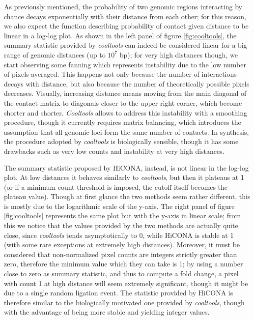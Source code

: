 As previously mentioned, the probability of two genomic regions interacting by chance decays exponentially with their distance from each other; for this reason, we also expect the function describing probability of contact given distance to be linear in a log-log plot. As shown in the left panel of figure \ref{fig:cooltools}, the summary statistic provided by \textit{cooltools} can indeed be considered linear for a big range of genomic distances (up to $10^7$ bp); for very high distances though, we start observing some fanning which represents instability due to the low number of pixels averaged. This happens not only because the number of interactions decays with distance, but also because the number of theoretically possible pixels decreases. Visually, increasing distance means moving from the main diagonal of the contact matrix to diagonals closer to the upper right corner, which become shorter and shorter. \textit{Cooltools} allows to address this instability with a smoothing procedure, though it currently requires matrix balancing, which introduces the assumption that all genomic loci form the same number of contacts. In synthesis, the procedure adopted by \textit{cooltools} is biologically sensible, though it has some drawbacks such as very low counts and instability at very high distances.


The summary statistic proposed by HiCONA, instead, is not linear in the log-log plot. At low distances it behaves similarly to \textit{cooltools}, but then it plateaus at 1 (or if a minimum count threshold is imposed, the cutoff itself becomes the plateau value). Though at first glance the two methods seem rather different, this is mostly due to the logarithmic scale of the y-axis. The right panel of figure \ref{fig:cooltools} represents the same plot but with the y-axis in linear scale; from this we notice that the values provided by the two methods are actually quite close, since \textit{cooltools} tends asymptotically to 0, while HiCONA is stable at 1 (with some rare exceptions at extremely high distances). Moreover, it must be considered that non-normalized pixel counts are integers strictly greater than zero, therefore the minimum value which they can take is 1; by using a number close to zero as summary statistic, and thus to compute a fold change, a pixel with count 1 at high distance will seem extremely significant, though it might be due to a single random ligation event. The statistic provided by HiCONA is therefore similar to the biologically motivated one provided by \textit{cooltools}, though with the advantage of being more stable and yielding integer values.


